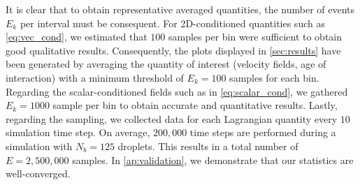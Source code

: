It is clear that to obtain representative averaged quantities, the number of events $E_k$ per interval must be consequent. 
For 2D-conditioned quantities such as \ref{eq:vec_cond}, we estimated that $100$ samples per bin were sufficient to obtain good qualitative results. 
Consequently, the plots displayed in \ref{sec:results} have been generated by averaging the quantity of interest (velocity fields, age of interaction) with a minimum threshold of $E_k = 100$ samples for each bin.
Regarding the scalar-conditioned fields such as in \ref{eq:scalar_cond}, we gathered $E_k = 1000$ sample per bin to obtain accurate and quantitative results. 
Lastly, regarding the sampling, we collected data for each Lagrangian quantity every $10$ simulation time step.
On average, $200,000$ time steps are performed during a simulation with $N_b = 125$ droplets. 
This results in a total number of $E = 2,500,000$ samples. 
In \ref{ap:validation}, we demonstrate that our statistics are well-converged.


